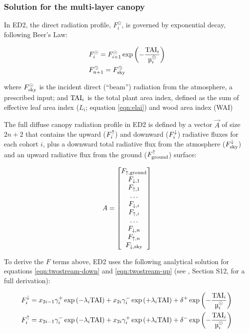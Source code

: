 \subsubsection{Solution for the multi-layer canopy}

In ED2, the direct radiation profile, $F^{\odot}_{i}$, is governed by exponential decay, following Beer's Law:

\begin{align}
  & F^{\odot}_{i} = F^{\odot}_{i+1} \exp\left( -\frac{\TAI_{i}}{\mu^{\odot}_{i}} \right) \\
  & F^{\odot}_{n+1} = F^{\odot}_{\sky}
\end{align}

where $F^{\odot}_{\mathrm{sky}}$ is the incident direct (``beam'') radiation from the atmosphere, a prescribed input;
and $\mathrm{TAI}_{i}$ is the total plant area index, defined as the sum of effective leaf area index ($L_{i}$; equation \ref{eqn:elai}) and wood area index (WAI)

The full diffuse canopy radiation profile in ED2 is defined by a vector $\vec{A}$ of size $2n + 2$ that contains the upward ($F^{\uparrow}_{i}$) and downward ($F^{\downarrow}_{i}$) radiative fluxes for each cohort $i$,
plus a downward total radiative flux from the atmosphere ($F^{\downarrow}_{\mathrm{sky}}$) and an upward radiative flux from the ground ($F^{\uparrow}_{\mathrm{ground}}$) surface:

\begin{equation}
  \relax{A} =
  \begin{bmatrix}
    F_{\uparrow,\mathrm{ground}} \\
    F_{\downarrow,1} \\
    F_{\uparrow, 1} \\
    \ldots \\
    F_{\downarrow,i} \\
    F_{\uparrow,i} \\
    \ldots \\
    F_{\downarrow,n} \\
    F_{\uparrow,n} \\
    F_{\downarrow,\mathrm{sky}}
  \end{bmatrix}
\end{equation}

To derive the $F$ terms above, ED2 uses the following analytical solution for equations \ref{eqn:twostream-down} and \ref{eqn:twostream-up} (see \citealt{longo2019ed2description}, Section S12, for a full derivation):

\begin{align}
  & F^{\down}_{i}
    = x_{2i-1}\gamma^{+}_{i}    \exp\left( -\lambda_{i} \TAI \right)
    + x_{2i}\gamma^{-}_{i}      \exp\left( +\lambda_{i} \TAI \right)
    + \delta^{+}               \exp\left( -\frac{\TAI_{i}}{\mu^{\odot}_{i}} \right) \\
  & F^{\up}_{i}
    = x_{2i-1}\gamma^{-}_{i}    \exp\left( -\lambda_{i} \TAI \right)
    + x_{2i}\gamma^{+}_{i}      \exp\left( +\lambda_{i} \TAI \right)
    + \delta^{-}               \exp\left( -\frac{\TAI_{i}}{\mu^{\odot}_{i}} \right) \\
\end{align}

